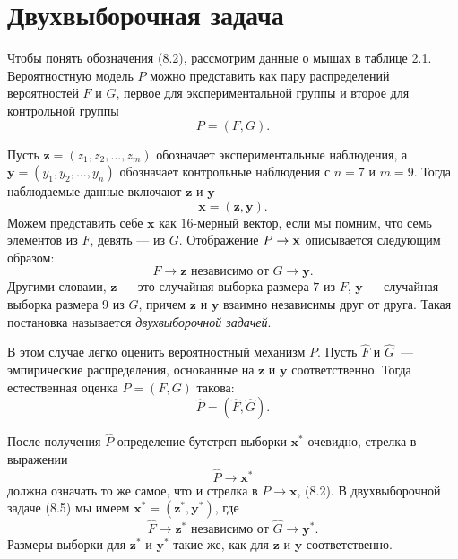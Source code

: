 \section{Двухвыборочная задача}

Чтобы понять обозначения (8.2), рассмотрим данные о мышах в таблице 2.1. Вероятностную модель $P$ можно представить как пару распределений вероятностей $F$ и $G$, первое для экспериментальной группы и второе для контрольной группы
\begin{equation}
	P = (F, G).
\end{equation}

Пусть $\textbf{z} = (z_1, z_2, \ldots, z_m)$ обозначает экспериментальные наблюдения, а $\textbf{y} = (y_1, y_2, \ldots, y_n)$ обозначает контрольные наблюдения с $n = 7$ и $m = 9$. Тогда наблюдаемые данные включают $\textbf{z}$ и $\textbf{y}$
\begin{equation}
	\textbf{x} = (\textbf{z}, \textbf{y}).
\end{equation}
Можем представить себе $\textbf{x}$ как $16$-мерный вектор, если мы помним, что семь элементов из $F$, девять --- из $G$. Отображение $P \to \bf{x}$ описывается следующим образом:
\begin{equation}
	F \to \textbf{z} \text{ независимо от } G \to \textbf{y}.
\end{equation}
Другими словами, $\textbf{z}$ --- это случайная выборка размера $7$ из $F$, $\textbf{y}$ --- случайная выборка размера $9$ из $G$, причем $\textbf{z}$ и $\textbf{y}$ взаимно независимы друг от друга. Такая постановка называется \textit{двухвыборочной задачей}. 

В этом случае легко оценить вероятностный механизм $P$. Пусть $\hat{F}$ и $\hat{G}$~--- эмпирические распределения, основанные на $\textbf{z}$ и $\textbf{y}$ соответственно. Тогда естественная оценка $P = (F, G)$ такова:
\begin{equation}
	\hat{P} = (\hat{F}, \hat{G}).
\end{equation}

После получения $\hat{P}$ определение бутстреп выборки $\textbf{x}^*$ очевидно, стрелка в выражении
\begin{equation}
	\hat{P} \to \textbf{x}^*
\end{equation}
должна означать то же самое, что и стрелка в $P \to \textbf{x}$, (8.2). В двухвыборочной задаче (8.5) мы имеем $\textbf{x}^* = (\textbf{z}^*, \textbf{y}^*)$, где
\begin{equation}
	\hat{F} \to \textbf{z}^* \text{ независимо от } \hat{G} \to \textbf{y}^*.
\end{equation}
Размеры выборки для $\textbf{z}^*$ и $\textbf{y}^*$ такие же, как для $\textbf{z}$ и $\textbf{y}$ соответственно.

